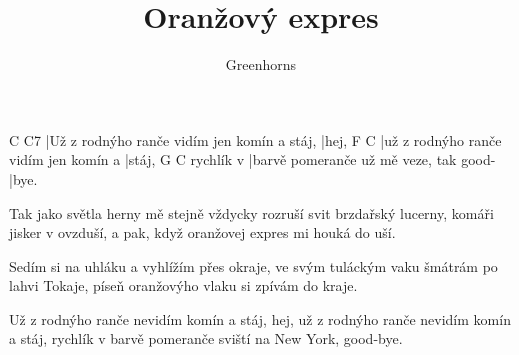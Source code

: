 \documentclass{song}
\title{Oranžový expres}
\author{Greenhorns}
\begin{document}
\strophe
C                                           C7
|Už z rodnýho ranče vidím jen komín a stáj, |hej,
F                                     C
|už z rodnýho ranče vidím jen komín a |stáj,
          G                                     C
rychlík v |barvě pomeranče už mě veze, tak good-|bye.
\endstrophe

\strophe*
Tak jako světla herny mě stejně vždycky rozruší
svit brzdařský lucerny, komáři jisker v ovzduší,
a pak, když oranžovej expres mi houká do uší.
\endstrophe

\begin{recitative}
\end{recitative}

\strophe*
Sedím si na uhláku a vyhlížím přes okraje,
ve svým tuláckým vaku šmátrám po lahvi Tokaje,
píseň oranžovýho vlaku si zpívám do kraje.
\endstrophe

\strophe*
Už z rodnýho ranče nevidím komín a stáj, hej,
už z rodnýho ranče nevidím komín a stáj,
rychlík v barvě pomeranče sviští na New York, good-bye.
\endstrophe
\end{document}
